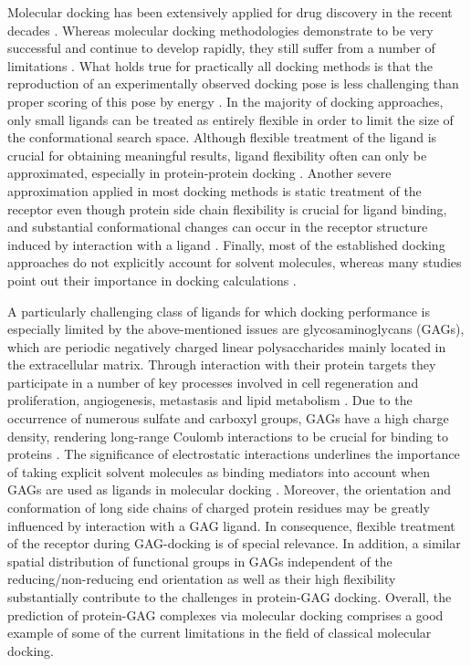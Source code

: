 Molecular docking has been extensively applied for drug
discovery in the recent decades \cite{klebe_recent_2000,
cheng_structure-based_2012}. Whereas molecular docking methodologies demonstrate
to be very successful and continue to develop rapidly, they still suffer from a
number of limitations \cite{moreira_proteinprotein_2010,
andrusier_principles_2008,lensink_docking_2010}. What holds true for practically
all docking methods is that the reproduction of an experimentally observed
docking pose is less challenging than proper scoring of this pose by energy
\cite{kim_assessment_2008, plewczynski_can_2011,smith_csar_2011}. In the
majority of docking approaches, only small ligands can be treated as entirely
flexible in order to limit the size of the conformational search space. Although
flexible treatment of the ligand is crucial for obtaining meaningful results,
ligand flexibility often can only be approximated, especially in protein-protein
docking \cite{ritchie_recent_2008}. Another severe approximation applied in most
docking methods is static treatment of the receptor even though protein side
chain flexibility is crucial for ligand binding, and substantial conformational
changes can occur in the receptor structure induced by interaction with a ligand
\cite{gunasekaran_how_2007,gutteridge_conformational_2005}. Finally, most of the
established docking approaches do not explicitly account for solvent molecules,
whereas many studies point out their importance in docking calculations
\cite{van_dijk_solvated_2006,baron_water_2010,roberts_ligandprotein_2008,
thilagavathi_ligand-protein_2010}.

A particularly challenging class of ligands for which docking
performance is especially limited by the above-mentioned issues are
glycosaminoglycans (GAGs), which are periodic negatively charged linear
polysaccharides mainly located in the extracellular matrix. Through interaction
with their protein targets they participate in a number of key processes
involved in cell regeneration and proliferation, angiogenesis, metastasis and
lipid metabolism \cite{hynes_extracellular_2009, macri_growth_2007,
barbero_chembiochem_2013}. Due to the occurrence of numerous sulfate and
carboxyl groups, GAGs have a high charge density, rendering long-range Coulomb
interactions to be crucial for binding to proteins
\cite{mulloy_specificity_2005}. The significance of electrostatic interactions
underlines the importance of taking explicit solvent molecules as binding
mediators into account when GAGs are used as ligands in molecular docking
\cite{samsonov_docking_2011}. Moreover, the orientation and conformation of long
side chains of charged protein residues may be greatly influenced by interaction
with a GAG ligand. In consequence, flexible treatment of the receptor during
GAG-docking is of special relevance. In addition, a similar spatial distribution
of functional groups in GAGs independent of the reducing/non-reducing end
orientation \cite{hp_binding_sites_mulloy_2006} as well as their high
flexibility \cite{bitomsky_docking_1999} substantially contribute to the
challenges in protein-GAG docking. Overall, the prediction of protein-GAG
complexes via molecular docking comprises a good example of some of the current
limitations in the field of classical molecular docking.

